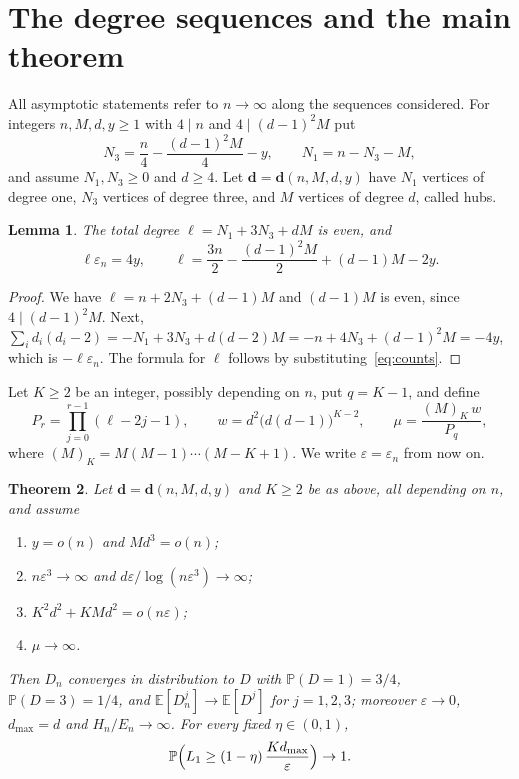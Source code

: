 \documentclass[11pt]{amsart}
\newtheorem{theorem}{Theorem}[section]
\newtheorem{lemma}[theorem]{Lemma}
\theoremstyle{definition}
\theoremstyle{remark}
\numberwithin{equation}{section}
\newcommand{\PP}{\mathbb P}
\newcommand{\E}{\mathbb E}
\newcommand{\eps}{\varepsilon}
\newcommand{\dmax}{d_{\max}}
\begin{document}
\section{The degree sequences and the main theorem}

All asymptotic statements refer to $n\to\infty$ along the sequences considered. For integers $n,M,d,y\ge1$ with $4\mid n$ and $4\mid(d-1)^2M$ put
\begin{equation}\label{eq:counts}
N_3=\frac n4-\frac{(d-1)^2M}{4}-y,\qquad N_1=n-N_3-M,
\end{equation}
and assume $N_1,N_3\ge0$ and $d\ge4$. Let $\mathbf d=\mathbf d(n,M,d,y)$ have $N_1$ vertices of degree one, $N_3$ vertices of degree three, and $M$ vertices of degree $d$, called hubs.

\begin{lemma}\label{lem:counts}
The total degree $\ell=N_1+3N_3+dM$ is even, and
\[
\ell\eps_n=4y,\qquad \ell=\frac{3n}{2}-\frac{(d-1)^2M}{2}+(d-1)M-2y .
\]
\end{lemma}

\begin{proof}
We have $\ell=n+2N_3+(d-1)M$ and $(d-1)M$ is even, since $4\mid(d-1)^2M$. Next, $\sum_i d_i(d_i-2)=-N_1+3N_3+d(d-2)M=-n+4N_3+(d-1)^2M=-4y$, which is $-\ell\eps_n$. The formula for $\ell$ follows by substituting~\eqref{eq:counts}.
\end{proof}

Let $K\ge2$ be an integer, possibly depending on $n$, put $q=K-1$, and define
\begin{equation}\label{eq:mu}
P_r=\prod_{j=0}^{r-1}(\ell-2j-1),\qquad w=d^2\bigl(d(d-1)\bigr)^{K-2},\qquad \mu=\frac{(M)_K\,w}{P_q},
\end{equation}
where $(M)_K=M(M-1)\cdots(M-K+1)$. We write $\eps=\eps_n$ from now on.

\begin{theorem}\label{thm:main}
Let $\mathbf d=\mathbf d(n,M,d,y)$ and $K\ge2$ be as above, all depending on $n$, and assume
\begin{enumerate}[label=\textup{(C\arabic*)}]
\item\label{C1} $y=o(n)$ and $Md^3=o(n)$;
\item\label{C2} $n\eps^3\to\infty$ and $d\eps/\log(n\eps^3)\to\infty$;
\item\label{C3} $K^2d^2+KMd^2=o(n\eps)$;
\item\label{C4} $\mu\to\infty$.
\end{enumerate}
Then $D_n$ converges in distribution to $D$ with $\PP(D=1)=3/4$, $\PP(D=3)=1/4$, and $\E[D_n^j]\to\E[D^j]$ for $j=1,2,3$; moreover $\eps\to0$, $\dmax=d$ and $H_n/E_n\to\infty$. For every fixed $\eta\in(0,1)$,
\[
\PP\Bigl(L_1\ge(1-\eta)\,\frac{K\dmax}{\eps}\Bigr)\to1 .
\]
\end{theorem}
\end{document}

